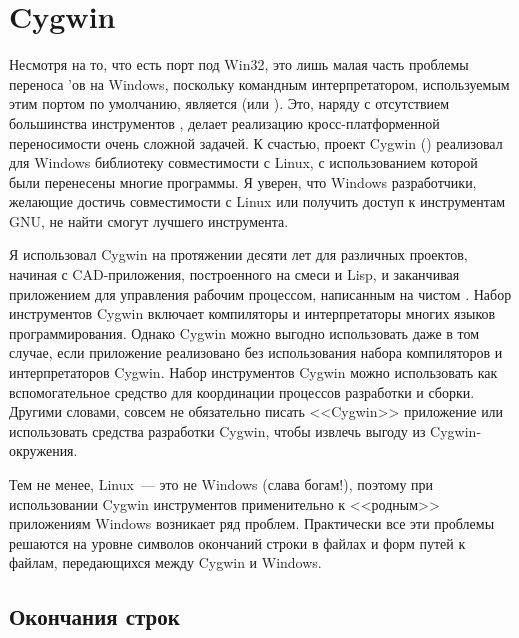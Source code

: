 \section{Cygwin}

Несмотря на то, что есть порт \GNUmake{} под Win32, это лишь малая
часть проблемы переноса \Makefile{}'ов на Windows, поскольку командным
интерпретатором, используемым этим портом по умолчанию, является
 (или ). Это, наряду с
отсутствием большинства инструментов \UNIX{}, делает реализацию
кросс-платформенной переносимости очень сложной задачей. К счастью,
проект Cygwin () реализовал
для Windows библиотеку совместимости с Linux, с использованием которой
были перенесены многие программы. Я уверен, что Windows разработчики,
желающие достичь совместимости с Linux или получить доступ к
инструментам GNU, не найти смогут лучшего инструмента.

Я использовал Cygwin на протяжении десяти лет для различных проектов,
начиная с CAD-приложения, построенного на смеси \Cplusplus{} и Lisp, и
заканчивая приложением для управления рабочим процессом, написанным на
чистом \Java{}. Набор инструментов Cygwin включает компиляторы и
интерпретаторы многих языков программирования. Однако Cygwin можно
выгодно использовать даже в том случае, если приложение реализовано
без использования набора компиляторов и интерпретаторов Cygwin. Набор
инструментов Cygwin можно использовать как вспомогательное средство
для координации процессов разработки и сборки. Другими словами, совсем
не обязательно писать <<Cygwin>> приложение или использовать средства
разработки Cygwin, чтобы извлечь выгоду из Cygwin-окружения.

Тем не менее, Linux~--- это не Windows (слава богам!), поэтому при
использовании Cygwin инструментов применительно к <<родным>>
приложениям Windows возникает ряд проблем. Практически все эти
проблемы решаются на уровне символов окончаний строки в файлах и форм
путей к файлам, передающихся между Cygwin и Windows.

\subsection*{Окончания строк}

